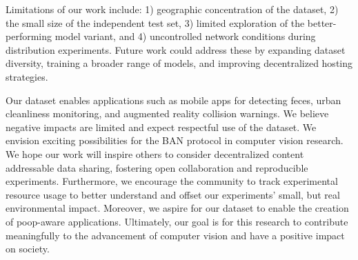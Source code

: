 \documentclass{article}
\newif\ifnonanonymous
\newif\ifuseappendix
\newif\ifuseacknowledgement
\newcommand{\redact}[1]{%
    \ifnonanonymous
        #1%
    \else
        [redacted for peer review]%
    \fi
}
\begin{document}
Limitations of our work include:
1) geographic concentration of the dataset,
2) the small size of the independent test set,
3) limited exploration of the better-performing model variant, and
4) uncontrolled network conditions during distribution experiments.
Future work could address these by expanding dataset diversity, training a
broader range of models, and improving decentralized hosting strategies.

Our dataset enables applications such as mobile apps for detecting feces, urban
cleanliness monitoring, and augmented reality collision warnings. We believe
negative impacts are limited and expect respectful use of the dataset.
We envision exciting possibilities for the BAN protocol in computer vision research.
We hope our work will inspire others to consider decentralized content addressable data sharing, fostering
  open collaboration and reproducible experiments.
Furthermore, we encourage the community to track experimental resource usage to better understand and offset
  our experiments' small, but real environmental impact.
Moreover, we aspire for our dataset to enable the creation of poop-aware applications.
Ultimately, our goal is for this research to contribute meaningfully to the advancement of computer vision
  and have a positive impact on society.
  
  
\ifuseacknowledgement
\section{Acknowledgements}
We would would like to thank all of the dogs that produced subject matter for the dataset, all of the
contributors for helping to construct a challenging test set, and \redact{Anthony Hoogs} for several suggestions including taking the 
  third negative picture.
This work is dedicated to \redact{Bezoar}, a very weird and very good girl.
\fi

{\small


}


\ifuseappendix


\fi
\end{document}
